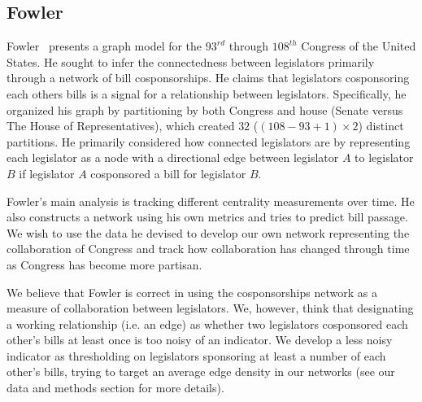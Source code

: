 \subsection{Fowler}

Fowler~\cite{Fowler} presents a graph model for the $93^{rd}$ through $108^{th}$
Congress of the United  States. He sought to infer the connectedness between
legislators primarily  through a network of bill cosponsorships. He claims that
legislators  cosponsoring each others bills is a signal for a relationship
between legislators. Specifically, he organized his graph by partitioning by
both Congress and house  (Senate versus The House of Representatives), which
created $32$  ($(108 - 93 + 1) \times 2$) distinct partitions. He primarily
considered how  connected legislators are by representing each legislator as a
node with a  directional edge between legislator $A$ to legislator $B$ if
legislator $A$  cosponsored a bill for legislator $B$.

Fowler's main analysis is tracking different centrality measurements over time.
He also constructs a network using his own metrics and tries to predict bill
passage. We wish to use the data he devised to develop our own network
representing the collaboration of Congress and track how collaboration has
changed through time as Congress has become more partisan.

We believe that Fowler is correct in using the cosponsorships network as a
measure of collaboration between legislators. We, however, think that 
designating a working relationship (i.e. an edge) as whether two legislators
cosponsored each other's bills at least once is too noisy of an indicator. We
develop a less noisy indicator as thresholding on legislators sponsoring at
least a number of each other's bills, trying to target an average edge density
in our networks (see our data and methods section for more details).

